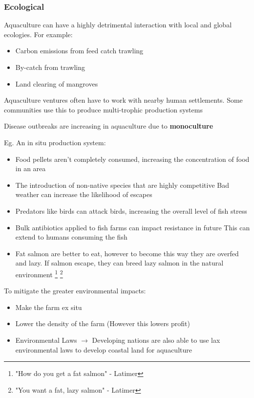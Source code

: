 		\subsubsection{Ecological}
			Aquaculture can have a highly detrimental interaction with local and global ecologies. For example:
			\begin{itemize}
				\item Carbon emissions from feed catch trawling
				\item By-catch from trawling
				\item Land clearing of mangroves
			\end{itemize}

			Aquaculture ventures often have to work with nearby human settlements. Some communities use this to produce multi-trophic production systems

			Disease outbreaks are increasing in aquaculture due to \textbf{monoculture}

			Eg. An in situ production system:
			\begin{itemize}
				\item Food pellets aren't completely consumed, increasing the concentration of food in an area
				\item The introduction of non-native species that are highly competitive
					\subitem Bad weather can increase the likelihood of escapes
				\item Predators like birds can attack birds, increasing the overall level of fish stress
				\item Bulk antibiotics applied to fish farms can impact resistance in future
					\subitem This can extend to humans consuming the fish 
				\item Fat salmon are better to eat, however to become this way they are overfed and lazy. If salmon escape, they can breed lazy salmon in the natural environment \footnote{"How do you get a fat salmon" - Latimer} \footnote{"You want a fat, lazy salmon" - Latimer}
			\end{itemize}

			To mitigate the greater environmental impacts:
			\begin{itemize}
				\item Make the farm ex situ
				\item Lower the density of the farm (However this lowers profit)
				\item Environmental Laws $\rightarrow$ Developing nations are also able to use lax environmental laws to develop coastal land for aquaculture
			\end{itemize}

